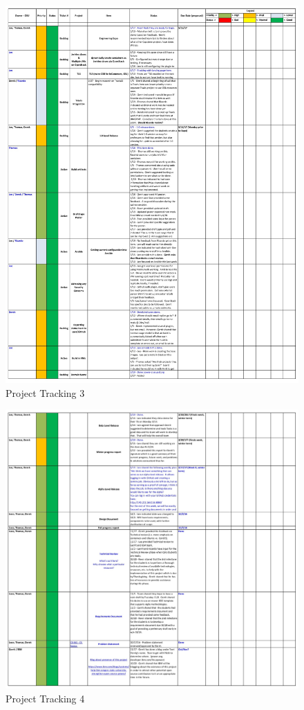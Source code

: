 \documentclass[10pt,letterpaper,onecolumn,draftclsnofoot]{IEEEtran}
\begin{document}
\begin{figure}[H]
  \includegraphics[width=\textwidth]{images/3.eps}
  \caption{Project Tracking 3}
\end{figure}
\begin{figure}[H]
  \includegraphics[width=\textwidth]{images/4.eps}
  \caption{Project Tracking 4}
\end{figure}
\end{document}
